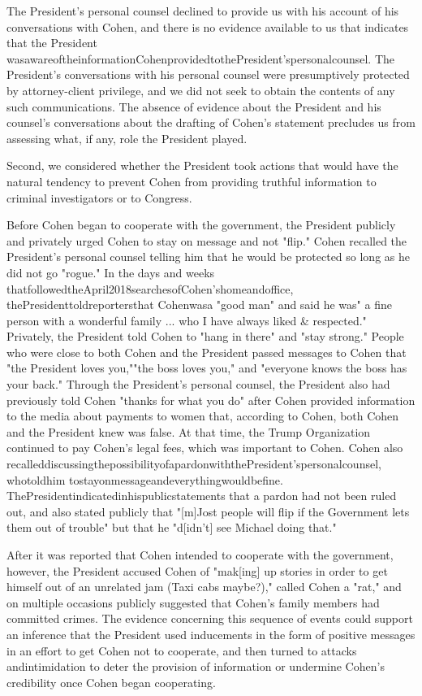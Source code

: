 {The President's personal counsel declined to provide us with his account of his conversations with Cohen, and there is no evidence available to us that indicates that the President wasawareoftheinformationCohenprovidedtothePresident'spersonalcounsel.
The President's conversations with his personal counsel were presumptively protected by attorney-client privilege, and we did not seek to obtain the contents of any such communications.
The absence of evidence about the President and his counsel's conversations about the drafting of Cohen's statement precludes us from assessing what, if any, role the President played.

Second, we considered whether the President took actions that would have the natural tendency to prevent Cohen from providing truthful information to criminal investigators or to Congress.

Before Cohen began to cooperate with the government, the President publicly and privately urged Cohen to stay on message and not "flip." Cohen recalled the President's personal counsel telling him that he would be protected so long as he did not go "rogue."
In the days and weeks thatfollowedtheApril2018searchesofCohen'shomeandoffice, thePresidenttoldreportersthat Cohenwasa "good man" and said he was" a fine person with a wonderful family ... who I have always liked \& respected."
Privately, the President told Cohen to "hang in there" and "stay strong." People who were close to both Cohen and the President passed messages to Cohen that "the President loves you,""the boss loves you," and "everyone knows the boss has your back."
Through the President's personal counsel, the President also had previously told Cohen "thanks for what you do" after Cohen provided information to the media about payments to women that, according to Cohen, both Cohen and the President knew was false.
At that time, the Trump Organization continued to pay Cohen's legal fees, which was important to Cohen.
Cohen also recalleddiscussingthepossibilityofapardonwiththePresident'spersonalcounsel, whotoldhim tostayonmessageandeverythingwouldbefine.
ThePresidentindicatedinhispublicstatements that a pardon had not been ruled out, and also stated publicly that "[m]Jost people will flip if the Government lets them out of trouble" but that he "d[idn't] see Michael doing that."

After it was reported that Cohen intended to cooperate with the government, however, the President accused Cohen of "mak[ing] up stories in order to get himself out of an unrelated jam (Taxi cabs maybe?)," called Cohen a "rat," and on multiple occasions publicly suggested that Cohen's family members had committed crimes.
The evidence concerning this sequence of events could support an inference that the President used inducements in the form of positive messages in an effort to get Cohen not to cooperate, and then turned to attacks andintimidation to deter the provision of information or undermine Cohen's credibility once Cohen began cooperating.

}
